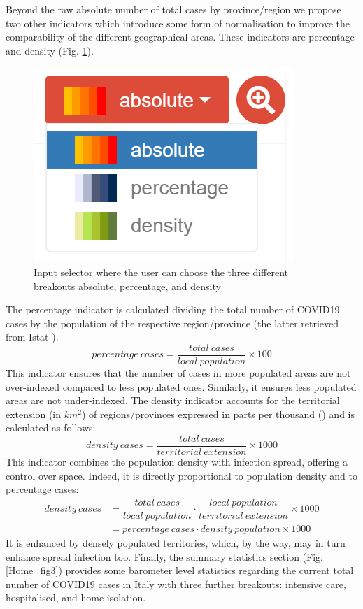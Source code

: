 \documentclass[
12pt, %
a4paper, %
oneside, %
headinclude,footinclude, %
BCOR5mm, %
]{scrartcl}
\begin{document}
Beyond the raw absolute number of total cases by province/region we propose two other indicators which introduce some form of normalisation to improve the comparability of the different geographical areas. These indicators are percentage and density (Fig. \ref{Home_fig2}).

\begin{figure}[h]
 \centering
 \includegraphics[width=0.5\linewidth]{Figures/Home_figure_2.png} 
 \caption{Input selector where the user can choose the three different breakouts absolute, percentage, and density}
 \label{Home_fig2}
\end{figure}

The percentage indicator is calculated dividing the total number of COVID19 cases by the population of the respective region/province (the latter retrieved from Istat \cite{Istat+res0,Istat+res1}).
\begin{equation}
percentage~cases = \frac{total~cases}{local~population} \times 100
\end{equation}
This indicator ensures that the number of cases in more populated areas are not over-indexed compared to less populated ones. Similarly, it ensures less populated areas are not under-indexed. 
The density indicator accounts for the territorial extension (in $km^2$) of regions/provinces expressed in parts per thousand (\textperthousand ) and is calculated as follows:
\begin{equation}
density~cases =  \dfrac{total~cases}{territorial~extension}\times 1000
\end{equation}
This indicator combines the population density with infection spread, offering a control over space. Indeed, it is directly proportional to population density and to percentage cases:
\begin{equation}
\begin{split}
density~cases & =   \dfrac{total~cases}{local~population} \cdot \dfrac{local~population}{territorial~extension} \times 1000 \\  & = percentage~cases \cdot density~population \times 1000
\end{split}
\end{equation}
It is enhanced by densely populated territories, which, by the way, may in turn enhance spread infection too.
Finally, the summary statistics section (Fig. \ref{Home_fig3}) provides some barometer level statistics regarding the current total number of COVID19 cases in Italy with three further breakouts: intensive care, hospitalised, and home isolation.
\end{document}

